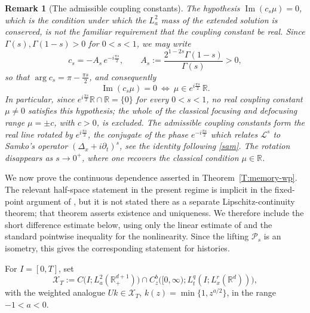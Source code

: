 \documentclass[11pt,letter]{amsart}
\def \RN {\mathbb{R}_+^{d+1}}
\def \R {\mathbb{R}}
\def \G{\Gamma}
\newcommand{\Rd}{\mathbb R^d}
\newcommand{\p}{\partial}
\numberwithin{equation}{section}
\newcommand{\Le}{\mathcal L}
\newtheorem{remark}[theorem]{Remark}
\numberwithin{equation}{section}
\begin{document}
\begin{remark}[The admissible coupling constants]\label{R:admissible-mu}
The hypothesis $\operatorname{Im}(c_s\mu)=0$, which is the condition under
which the $L^2_a$ mass of the extended solution is conserved, is \emph{not} the
familiar requirement that the coupling constant be real. Since
$\G(s),\G(1-s)>0$ for $0<s<1$, we may write
\[
c_s=-A_s\,e^{-i\frac{\pi s}{2}},
\qquad
A_s:=\frac{2^{1-2s}\G(1-s)}{\G(s)}>0,
\]
so that $\arg c_s=\pi-\frac{\pi s}{2}$, and consequently
\begin{equation}\label{E:admissible-mu}
\operatorname{Im}(c_s\mu)=0
\ \Longleftrightarrow\
\mu\in e^{i\frac{\pi s}{2}}\,\R .
\end{equation}
In particular, since $e^{i\frac{\pi s}{2}}\R\cap\R=\{0\}$ for every $0<s<1$, no
\emph{real} coupling constant $\mu\ne0$ satisfies this hypothesis; the whole of
the classical focusing and defocusing range $\mu=\pm c$, with $c>0$, is
excluded. The admissible coupling constants form the
real line rotated by $e^{i\frac{\pi s}{2}}$, the conjugate of the phase
$e^{-i\frac{\pi s}{2}}$ which relates $\Le^s$ to Samko's operator
$(\Delta_x+i\p_t)^s$, see the identity following \eqref{sam}. The rotation
disappears as $s\to0^+$, where one recovers the classical condition
$\mu\in\R$.
\end{remark}

We now prove the continuous dependence asserted in Theorem~\ref{T:memory-wp}.
The relevant half-space statement in the present regime is implicit in the fixed-point argument of
\cite[Theorem~2.9]{GS2}, but it is not stated there as a separate
Lipschitz-continuity theorem; that theorem asserts existence and uniqueness. We therefore include
the short difference estimate below, using only the linear estimate of
\cite[Theorem~2.4]{GS2} and the standard pointwise inequality for the
nonlinearity. Since the lifting \(\mathcal P_s\) is an isometry, this gives the
corresponding statement for histories.

For \(I=[0,T]\), set
\[
\mathcal X_T:=C\bigl(I;L^2_a(\RN)\bigr)\cap
C^b_z\bigl([0,\infty);L^q_t(I;L^r_x(\Rd))\bigr),
\]
with the weighted analogue \(Uk\in\mathcal X_T\),
\(k(z)=\min\{1,z^{a/2}\}\), in the range \(-1<a<0\).
\end{document}
